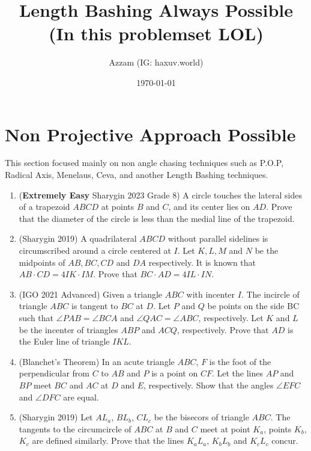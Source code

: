 \documentclass[12pt]{scrartcl}
\title{Length Bashing Always Possible (In this problemset LOL)}
\author{Azzam (IG: haxuv.world)}
\date{\today}
\begin{document}
\maketitle

\renewcommand*\contentsname{Daftar Isi}
\tableofcontents

\newpage
\section{Non Projective Approach Possible}
This section focused mainly on non angle chasing techniques such as P.O.P, Radical Axis, Menelaus, Ceva, and another Length Bashing techniques.
\begin{enumerate}
    \item (\textbf{Extremely Easy} Sharygin 2023 Grade 8) A circle touches the lateral sides of a trapezoid $ABCD$ at points $B$ and $C$, and its center lies on $AD$. Prove that the diameter of the circle is less than the medial line of the trapezoid.

    \item (Sharygin 2019) A quadrilateral $ABCD$ without parallel sidelines is circumscribed around a circle centered at $I$. Let $K, L, M$ and $N$ be the midpoints of $AB, BC, CD$ and $DA$ respectively. It is known that $AB \cdot CD = 4IK \cdot IM$. Prove that $BC \cdot AD = 4IL \cdot IN$.
    
    \item (IGO 2021 Advanced) Given a triangle $ABC$ with incenter $I$. The incircle of triangle $ABC$ is tangent to $BC$ at $D$. Let $P$ and $Q$ be points on the side BC such that $\angle PAB = \angle BCA$ and $\angle QAC = \angle ABC$, respectively. Let $K$ and $L$ be the incenter of triangles $ABP$ and $ACQ$, respectively. Prove that $AD$ is the Euler line of triangle $IKL$.

    \item (Blanchet’s Theorem) In an acute triangle $ABC$, $F$ is the foot of the perpendicular from $C$ to $AB$ and $P$ is a point on $CF$. Let the lines $AP$ and $BP$ meet $BC$ and $AC$ at $D$ and $E$, respectively. Show that the angles $\angle EFC$ and $\angle DFC$ are equal.

    \item (Sharygin 2019) Let $AL_a$, $BL_b$, $CL_c$ be the bisecors of triangle $ABC$. The tangents to the circumcircle of $ABC$ at $B$ and $C$ meet at point $K_a$, points $K_b$, $K_c$ are defined similarly. Prove that the lines $K_aL_a$, $K_bL_b$ and $K_cL_c$ concur.


\end{enumerate}
\end{document}
